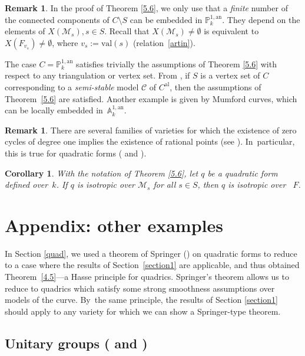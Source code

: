 \documentclass[JEP,XML,SOM,Unicode,NoFloatCountersInSection,published]{cedram}
\newcommand{\al}{\mathrm{al}}
\newcommand{\val}{\mathrm{val}}
\let\backslash\setminus
\newtheorem{cor}[thm]{Corollary}
\theoremstyle{definition}
\newtheorem{rem}[thm]{Remark}
\begin{document}
\begin{rem} \label{5.7}
In the proof of Theorem \ref{5.6}, we only use that a \emph{finite} number of the connected components of $C \backslash S$ can be embedded in $\mathbb{P}_k^{1, \mathrm{an}}$. They depend on the elements of $X(\mathscr{M}_{s}), s\in S$. Recall that $X(\mathscr{M}_s) \neq \emptyset$ is equivalent to $X(F_{v_s}) \neq \emptyset$, where $v_s:=\val(s)$ (\cf relation~\eqref{artin}).

The case $C=\mathbb{P}_k^{1, \mathrm{an}}$ satisfies trivially the assumptions of Theorem \ref{5.6} with respect to any triangulation or vertex set. From \cite[4.4]{lordan}, if $S$ is a vertex set of $C$ corresponding to a \emph{semi-stable} model $\mathscr{C}$ of $C^{\al}$, then the assumptions of Theorem~\ref{5.6} are satisfied. Another example is given by Mumford curves, which can be locally embedded in~$\mathbb{A}_k^{1, \mathrm{an}}$.
\end{rem}

\begin{rem} \label{5.8}
There are several families of varieties for which the existence of zero cycles of degree one implies the existence of rational points (\eg see \cite{parimala}). In~particular, this is true for quadratic forms (\cf \cite[VI, Prop.\,1.9]{lam} and \cite{gillen}).
\end{rem}

\begin{cor} \label{5.9}
With the notation of Theorem \ref{5.6}, let $q$ be a quadratic form defined over~$k$. If $q$ is isotropic over $\mathscr{M}_{s}$ for all $s \in S$, then $q$ is isotropic over ~$F$.
\end{cor}

\section{Appendix: other examples} \label{appendix}

In Section \ref{quad}, we used a theorem of Springer (\cite[VI, Prop.\,1.9]{lam}) on quadratic forms to reduce to a case where the results of Section~\ref{section1} are applicable, and thus obtained Theorem~\ref{4.5}---a Hasse principle for quadrics. Springer's theorem allows us to reduce to quadrics which satisfy some strong smoothness assumptions over models of the curve.
By~the same principle, the results of Section \ref{section1} should apply to any variety for which we can show a Springer-type theorem.
\subsection{Unitary groups (\cf \cite{wu} and \cite[\S 12]{parsur})} \label{unitary}
\end{document}
